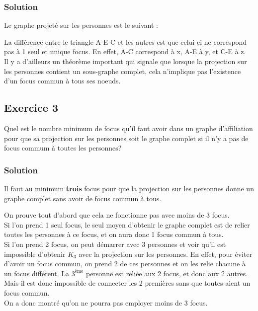     \subsubsection*{Solution}
    Le graphe projeté sur les personnes est le suivant :
    
    \begin{center}    
    \end{center}
    
    La différence entre le triangle A-E-C et les autres est que celui-ci ne correspond pas à 1 seul et unique focus.
    En effet, A-C correspond à x, A-E à y, et C-E à z.\\
    Il y a d'ailleurs un théorème important qui signale que lorsque la projection sur les personnes contient un sous-graphe complet, cela n'implique pas l'existence d'un focus commun à tous ses noeuds.
    

\subsection*{Exercice 3}
Quel est le nombre minimum de focus qu'il faut avoir dans un graphe d'affiliation
pour que sa projection sur les personnes soit le graphe complet si il n'y a pas de focus commum \`{a} toutes les personnes?

    \subsubsection*{Solution}
    Il faut au minimum \textbf{trois} focus pour que la projection sur les personnes donne un graphe complet sans avoir de focus commun à tous.
    
    On prouve tout d'abord que cela ne fonctionne pas avec moins de 3 focus.\\
    Si l'on prend 1 seul focus, le seul moyen d'obtenir le graphe complet est de relier toutes les personnes à ce focus, et on aura donc 1 focus commun à tous.\\
    Si l'on prend 2 focus, on peut démarrer avec 3 personnes et voir qu'il est impossible d'obtenir $K_3$ avec la projection sur les personnes.
    En effet, pour éviter d'avoir un focus commun, on prend 2 de ces personnes et on les relie chacune à un focus différent.
    La $3^{\text{ème}}$ personne est reliée aux 2 focus, et donc aux 2 autres.
    Mais il est donc impossible de connecter les 2 premières sans que toutes aient un focus commun.\\
    On a donc montré qu'on ne pourra pas employer moins de 3 focus.
    
